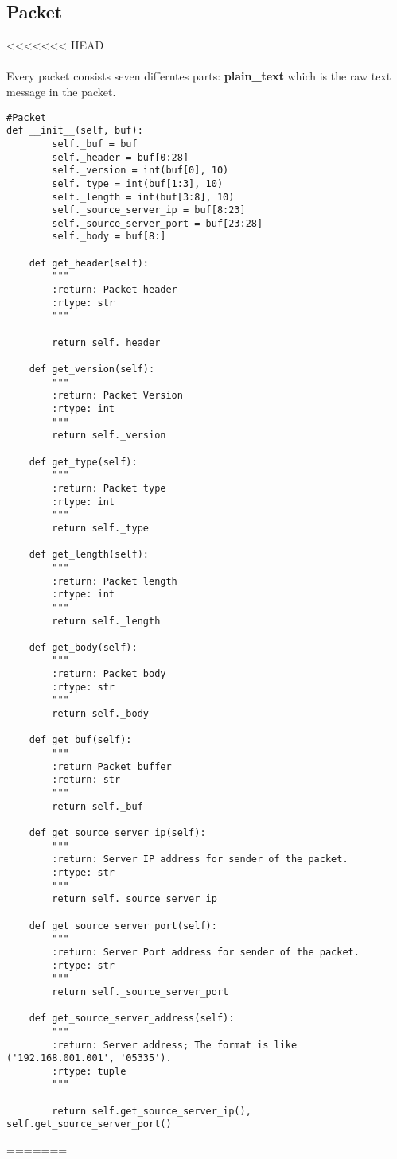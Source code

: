 \documentclass{article}
\begin{document}
\subsection{Packet}
<<<<<<< HEAD
\paragraph{}Every packet consists seven differntes parts: \textbf{plain\_text} which is the raw text message in the packet.\\
\begin{lstlisting}
#Packet
def __init__(self, buf):
        self._buf = buf
        self._header = buf[0:28]
        self._version = int(buf[0], 10)
        self._type = int(buf[1:3], 10)
        self._length = int(buf[3:8], 10)
        self._source_server_ip = buf[8:23]
        self._source_server_port = buf[23:28]
        self._body = buf[8:]

    def get_header(self):
        """
        :return: Packet header
        :rtype: str
        """

        return self._header

    def get_version(self):
        """
        :return: Packet Version
        :rtype: int
        """
        return self._version

    def get_type(self):
        """
        :return: Packet type
        :rtype: int
        """
        return self._type

    def get_length(self):
        """
        :return: Packet length
        :rtype: int
        """
        return self._length

    def get_body(self):
        """
        :return: Packet body
        :rtype: str
        """
        return self._body

    def get_buf(self):
        """
        :return Packet buffer
        :return: str
        """
        return self._buf

    def get_source_server_ip(self):
        """
        :return: Server IP address for sender of the packet.
        :rtype: str
        """
        return self._source_server_ip

    def get_source_server_port(self):
        """
        :return: Server Port address for sender of the packet.
        :rtype: str
        """
        return self._source_server_port

    def get_source_server_address(self):
        """
        :return: Server address; The format is like ('192.168.001.001', '05335').
        :rtype: tuple
        """

        return self.get_source_server_ip(), self.get_source_server_port()
\end{lstlisting}
=======
\end{document}
